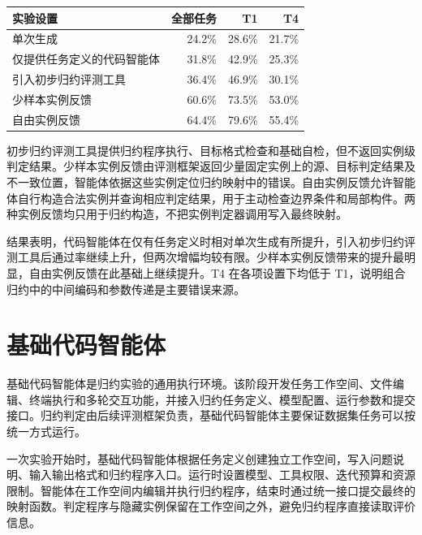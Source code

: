 \begin{table}[!htbp]
    \label{tab:ablation-results}
    \centering
    \footnotesize
    \setlength{\tabcolsep}{5pt}
    \renewcommand{\arraystretch}{1.05}
    \begin{tabular}{lrrr}
        \hline
        实验设置 & 全部任务 & T1 & T4\\
        \hline
        单次生成 & 24.2\% & 28.6\% & 21.7\%\\
        仅提供任务定义的代码智能体 & 31.8\% & 42.9\% & 25.3\%\\
        引入初步归约评测工具 & 36.4\% & 46.9\% & 30.1\%\\
        少样本实例反馈 & 60.6\% & 73.5\% & 53.0\%\\
        自由实例反馈 & 64.4\% & 79.6\% & 55.4\%\\
        \hline
    \end{tabular}
\end{table}

初步归约评测工具提供归约程序执行、目标格式检查和基础自检，但不返回实例级判定结果。少样本实例反馈由评测框架返回少量固定实例上的源、目标判定结果及不一致位置，智能体依据这些实例定位归约映射中的错误。自由实例反馈允许智能体自行构造合法实例并查询相应判定结果，用于主动检查边界条件和局部构件。两种实例反馈均只用于归约构造，不把实例判定器调用写入最终映射。

结果表明，代码智能体在仅有任务定义时相对单次生成有所提升，引入初步归约评测工具后通过率继续上升，但两次增幅均较有限。少样本实例反馈带来的提升最明显，自由实例反馈在此基础上继续提升。T4 在各项设置下均低于 T1，说明组合归约中的中间编码和参数传递是主要错误来源。

\section{基础代码智能体}

基础代码智能体是归约实验的通用执行环境。该阶段开发任务工作空间、文件编辑、终端执行和多轮交互功能，并接入归约任务定义、模型配置、运行参数和提交接口。归约判定由后续评测框架负责，基础代码智能体主要保证数据集任务可以按统一方式运行。

一次实验开始时，基础代码智能体根据任务定义创建独立工作空间，写入问题说明、输入输出格式和归约程序入口。运行时设置模型、工具权限、迭代预算和资源限制。智能体在工作空间内编辑并执行归约程序，结束时通过统一接口提交最终的映射函数。判定程序与隐藏实例保留在工作空间之外，避免归约程序直接读取评价信息。


